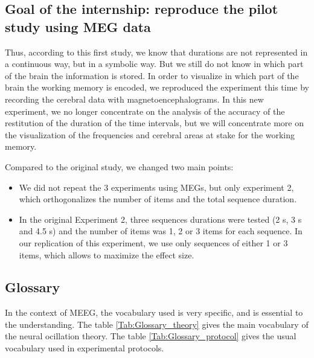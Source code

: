 \subsection{Goal of the internship: reproduce the pilot study using MEG data}

Thus, according to this first study, we know that durations are not represented in a continuous way, but in a symbolic way. But we still do not know in which part of the brain the information is stored. In order to visualize in which part of the brain the working memory is encoded, we reproduced the experiment this time by recording the cerebral data with magnetoencephalograms. In this new experiment, we no longer concentrate on the analysis of the accuracy of the restitution of the duration of the time intervals, but we will concentrate more on the visualization of the frequencies and cerebral areas at stake for the working memory.

Compared to the original study, we changed two main points:

\begin{itemize}
    \item We did not repeat the 3 experiments using MEGs, but only experiment 2, which orthogonalizes the number of items and the total sequence duration.
    \item In the original Experiment 2, three sequences durations were tested (2 s, 3 s and 4.5 s) and the number of items was 1, 2 or 3 items for each sequence. In our replication of this experiment, we use only sequences of either 1 or 3 items, which allows to maximize the effect size.
\end{itemize}



\subsection{Glossary}

In the context of MEEG, the vocabulary used is very specific, and is essential to the understanding. The table \ref{Tab:Glossary_theory} gives the main vocabulary of the neural ocillation theory. The table \ref{Tab:Glossary_protocol} gives the usual vocabulary used in experimental protocols.

